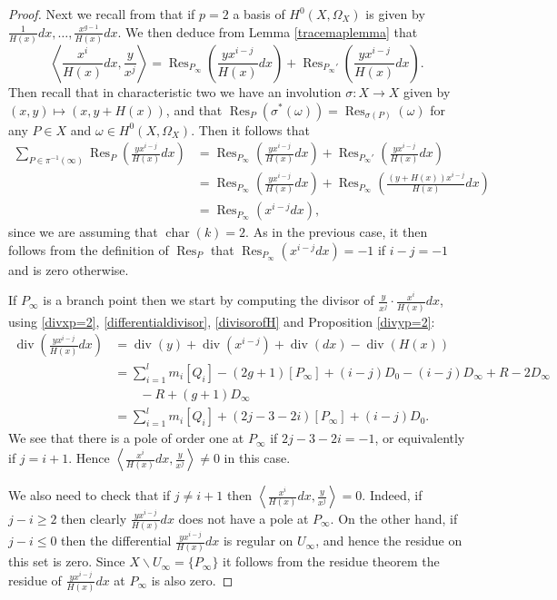 \documentclass[draft, 11pt]{article} %
\theoremstyle{plain}
\theoremstyle{remark}
\newcommand{\ra}{\rightarrow}
\newcommand{\hzero}{{H^0(X,\Omega_X)}}
\DeclareMathOperator{\res}{Res}
\DeclareMathOperator{\di}{div}
\DeclareMathOperator{\cha}{char}
\begin{document}
\begin{proof}
Next we recall from \cite[Chap 7, Prop. 4.26]{liu} that if $p=2$ a basis of $\hzero$ is given by $\frac{1}{H(x)}dx, \ldots, \frac{x^{g-1}}{H(x)}dx$.
We then deduce from Lemma \ref{tracemaplemma} that
\[
\left \langle \frac{x^i}{H(x)}dx, \frac{y}{x^j} \right \rangle = \res_{P_\infty} \left( \frac{yx^{i-j}}{H(x)}dx \right) + \res_{P_\infty'}\left( \frac{yx^{i-j}}{H(x)} dx \right).
\]
Then recall that in characteristic two we have an involution $\sigma \colon X \ra X$ given by $(x,y) \mapsto (x, y + H(x))$, and that $\res_P(\sigma^*(\omega)) = \res_{\sigma(P)}(\omega)$ for any $P \in X$ and $\omega\in \hzero$.
Then it follows that
\begin{align*}
\sum_{P \in \pi^{-1}(\infty)} \res_P \left( \frac{yx^{i-j}}{H(x)}dx \right) & = \res_{P_\infty} \left( \frac{yx^{i-j}}{H(x)} dx \right) + \res_{P_\infty'}\left( \frac{yx^{i-j}}{H(x)} dx\right) \\
& = \res_{P_ \infty} \left( \frac{yx^{i-j}}{H(x)}dx \right) + \res_{P_ \infty} \left( \frac{(y+H(x))x^{i-j}}{H(x)}dx \right) \\
& = \res_{P_\infty}(x^{i-j}dx),
\end{align*}
since we are assuming that $\cha(k) = 2$.
As in the previous case, it then follows from the definition of $\res_P$ that $\res_{P_\infty}(x^{i-j}dx) = -1$ if $i-j = -1$ and is zero otherwise.



If $P_\infty$ is a branch point then we start by computing the divisor of $ \frac{y}{x^j} \cdot \frac{x^i}{H(x)}dx$, using \eqref{divxp=2}, \eqref{differentialdivisor}, \eqref{divisorofH} and Proposition \ref{divyp=2}:
\begin{align*}
\di\left( \frac{yx^{i-j}}{H(x)}dx \right) & = \di(y) + \di(x^{i-j}) + \di( dx) - \di(H(x)) \\
& = \sum_{i=1}^l m_i[Q_i] - (2g+ 1 )[P_\infty] + (i-j)D_0 - (i-j)D_\infty + R - 2D_\infty \\
& \qquad - R + (g+1)D_\infty\\
& = \sum_{i=1}^l m_i[Q_i] + (2j-3-2i)[P_\infty] + (i-j)D_0.
\end{align*}
We see that there is a pole of order one at $P_\infty$ if $2j - 3 - 2i = -1$, or equivalently if $j = i+1$.
Hence $\left\langle \frac{x^i}{H(x)}dx, \frac{y}{x^j} \right\rangle \neq 0$ in this case.

We also need to check that if $j \neq i+1$ then $\left \langle \frac{x^i}{H(x)}dx, \frac{y}{x^j} \right \rangle = 0$.
Indeed, if $j-i \geq 2$ then clearly $\frac{yx^{i-j}}{H(x)}dx$ does not have a pole at $P_\infty$.
On the other hand, if $j-i \leq 0$ then the differential $\frac{yx^{i-j}}{H(x)}dx$ is regular on $U_\infty$, and hence the residue on this set is zero.
Since $X \backslash U_\infty = \{P_\infty\}$ it follows from the residue theorem the residue of $\frac{yx^{i-j}}{H(x)}dx$ at $P_\infty$ is also zero.
\end{proof}
\end{document}
